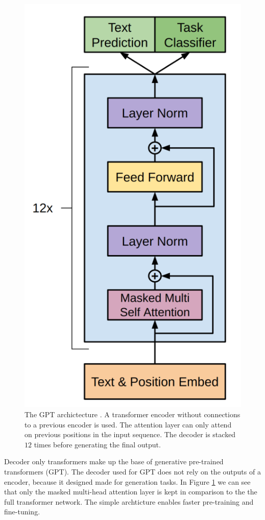 \documentclass[../../main.tex]{subfiles}
\begin{document}
\begin{figure}[t]
	\centering
	\includegraphics[scale=0.3]{include/images/gpt_architecture.png}
	\caption{
		The GPT archictecture \cite{Radford2018}.
		A transformer encoder
		without connections to a previous encoder is used.
		The attention layer
		can only attend on previous positions in the input sequence.
		The decoder is stacked $12$ times before generating the final output.
	}
	\label{fig:gpt_arch}
\end{figure}

Decoder only transformers make up the base of generative pre-trained transformers (GPT).
The decoder used for GPT does not rely on the outputs of a encoder,
because it designed made for generation tasks.
In Figure \ref{fig:gpt_arch} we can see
that only the masked multi-head attention layer is kept in comparison to
the the full transformer network.
The simple archticture enables faster pre-training and fine-tuning.
\end{document}
